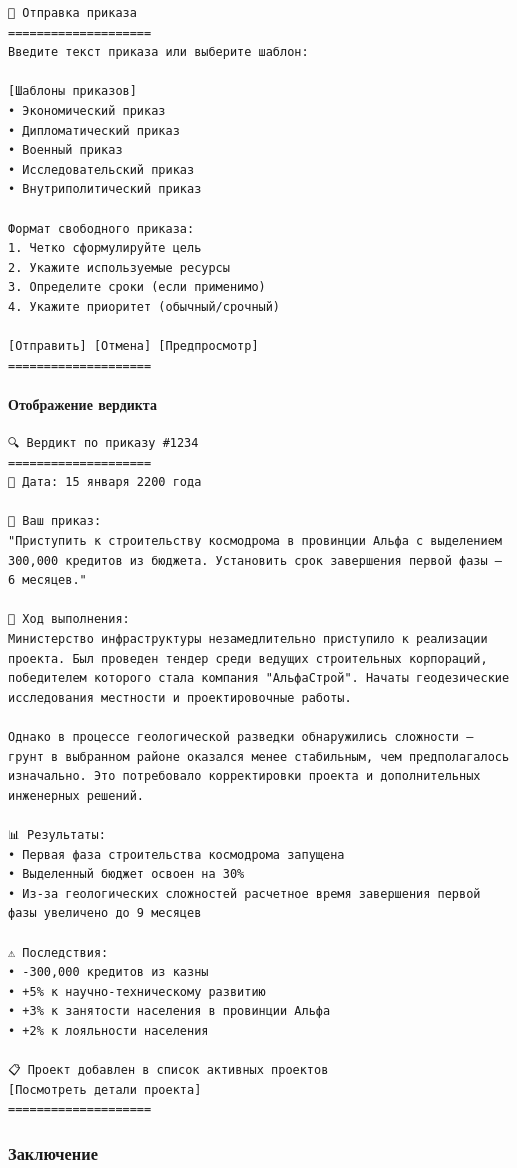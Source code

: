 \begin{verbatim}
📝 Отправка приказа
====================
Введите текст приказа или выберите шаблон:

[Шаблоны приказов]
• Экономический приказ
• Дипломатический приказ
• Военный приказ
• Исследовательский приказ
• Внутриполитический приказ

Формат свободного приказа:
1. Четко сформулируйте цель
2. Укажите используемые ресурсы
3. Определите сроки (если применимо)
4. Укажите приоритет (обычный/срочный)

[Отправить] [Отмена] [Предпросмотр]
====================
\end{verbatim}

\paragraph{Отображение вердикта}

\begin{verbatim}
🔍 Вердикт по приказу #1234
====================
📅 Дата: 15 января 2200 года

📌 Ваш приказ:
"Приступить к строительству космодрома в провинции Альфа с выделением 300,000 кредитов из бюджета. Установить срок завершения первой фазы — 6 месяцев."

🔄 Ход выполнения:
Министерство инфраструктуры незамедлительно приступило к реализации проекта. Был проведен тендер среди ведущих строительных корпораций, победителем которого стала компания "АльфаСтрой". Начаты геодезические исследования местности и проектировочные работы.

Однако в процессе геологической разведки обнаружились сложности — грунт в выбранном районе оказался менее стабильным, чем предполагалось изначально. Это потребовало корректировки проекта и дополнительных инженерных решений.

📊 Результаты:
• Первая фаза строительства космодрома запущена
• Выделенный бюджет освоен на 30%
• Из-за геологических сложностей расчетное время завершения первой фазы увеличено до 9 месяцев

⚠️ Последствия:
• -300,000 кредитов из казны
• +5% к научно-техническому развитию
• +3% к занятости населения в провинции Альфа
• +2% к лояльности населения

📋 Проект добавлен в список активных проектов
[Посмотреть детали проекта]
====================
\end{verbatim}

\subsubsection{Заключение}

